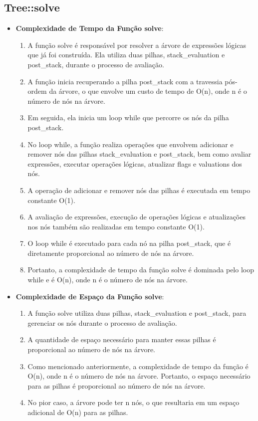 \documentclass{article}
\begin{document}
\subsection{Tree::solve}
\begin{itemize}
  \item \textbf{Complexidade de Tempo da Função solve}:
    \begin{enumerate}
      \item A função solve é responsável por resolver a árvore de expressões lógicas que já foi construída. Ela utiliza duas pilhas, stack\_evaluation e post\_stack, durante o processo de avaliação.
      \item A função inicia recuperando a pilha post\_stack com a travessia pós-ordem da árvore, o que envolve um custo de tempo de O(n), onde n é o número de nós na árvore.
      \item Em seguida, ela inicia um loop while que percorre os nós da pilha post\_stack.
      \item No loop while, a função realiza operações que envolvem adicionar e remover nós das pilhas stack\_evaluation e post\_stack, bem como avaliar expressões, executar operações lógicas, atualizar flags e valuations dos nós.
      \item A operação de adicionar e remover nós das pilhas é executada em tempo constante O(1).
      \item A avaliação de expressões, execução de operações lógicas e atualizações nos nós também são realizadas em tempo constante O(1).
      \item O loop while é executado para cada nó na pilha post\_stack, que é diretamente proporcional ao número de nós na árvore.
      \item Portanto, a complexidade de tempo da função solve é dominada pelo loop while e é O(n), onde n é o número de nós na árvore.
    \end{enumerate}
  \item \textbf{Complexidade de Espaço da Função solve}:
    \begin{enumerate}
      \item A função solve utiliza duas pilhas, stack\_evaluation e post\_stack, para gerenciar os nós durante o processo de avaliação.
      \item A quantidade de espaço necessário para manter essas pilhas é proporcional ao número de nós na árvore.
      \item Como mencionado anteriormente, a complexidade de tempo da função é O(n), onde n é o número de nós na árvore. Portanto, o espaço necessário para as pilhas é proporcional ao número de nós na árvore.
      \item No pior caso, a árvore pode ter n nós, o que resultaria em um espaço adicional de O(n) para as pilhas.
    \end{enumerate}
\end{itemize}
\end{document}
